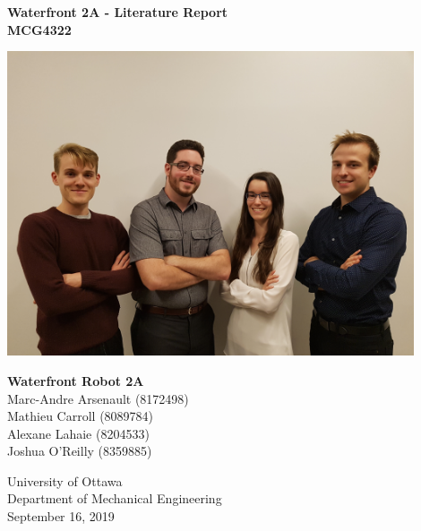 
\begin{titlepage}
    \begin{center}
        \textbf{Waterfront 2A - Literature Report}\\
        \textbf{MCG4322}
        
        \vfill
        
        \includegraphics[width=12cm]{Titlepage/img/team_picture.jpg}
        
        \vfill
        
        \textbf{Waterfront Robot 2A}\\
        Marc-Andre Arsenault (8172498)\\
        Mathieu Carroll (8089784)\\
        Alexane Lahaie (8204533)\\
        Joshua O'Reilly (8359885)\\
  
        \vfill
  
        University of Ottawa\\
        Department of Mechanical Engineering\\
        September 16, 2019
  
    \end{center}
 \end{titlepage}